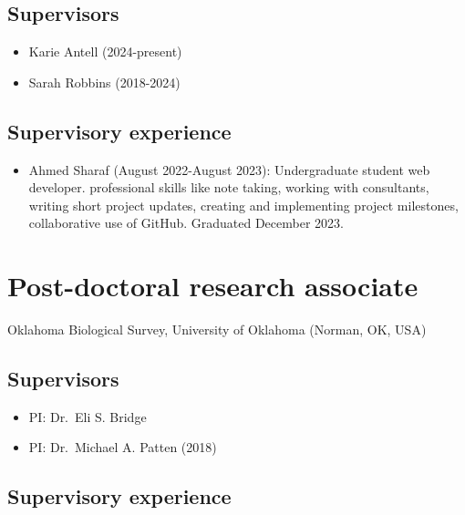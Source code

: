 \documentclass[
  letterpaper,
  DIV=11,
  numbers=noendperiod,
  oneside]{scrreprt}
\providecommand{\tightlist}{%
  \setlength{\itemsep}{0pt}\setlength{\parskip}{0pt}}\usepackage{longtable,booktabs,array}
\begin{document}
\subsection{Supervisors}\label{supervisors}

\begin{itemize}
\tightlist
\item
  Karie Antell (2024-present)
\item
  Sarah Robbins (2018-2024)
\end{itemize}

\subsection{Supervisory experience}\label{supervisory-experience}

\begin{itemize}
\tightlist
\item
  Ahmed Sharaf (August 2022-August 2023): Undergraduate student web
  developer. professional skills like note taking, working with
  consultants, writing short project updates, creating and implementing
  project milestones, collaborative use of GitHub. Graduated December
  2023.
\end{itemize}

\section{Post-doctoral research
associate}\label{post-doctoral-research-associate}

Oklahoma Biological Survey, University of Oklahoma (Norman, OK, USA)


\subsection{Supervisors}\label{supervisors-1}

\begin{itemize}
\tightlist
\item
  PI: Dr.~Eli S. Bridge
\item
  PI: Dr.~Michael A. Patten (2018)
\end{itemize}

\subsection{Supervisory experience}\label{supervisory-experience-1}
\end{document}
